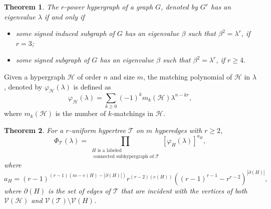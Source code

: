 \documentclass[10pt,a4paper]{article}
\newtheorem{proposition}{Proposition}[section]
\newtheorem{theorem}{Theorem}[section]
\begin{document}
	
	\begin{theorem}\cite{chen2023all}\label{eigenvalues_of_power}
		The $r$-power hypergraph of a graph $G$, denoted by $G^r$  has an eigenvalue $\lambda$ if and only if 
		\begin{itemize}
			\item some signed induced subgraph of $G$ has an eigenvalue $\beta$ such that $\beta^2 = \lambda^r$, if $r =3$;
			\item some signed subgraph of $G$ has an eigenvalue $\beta$ such that $\beta^2= \lambda^r$, if $r \geq 4$.
		\end{itemize}
	\end{theorem}
	
	\noindent Given a hypergraph $\mathcal{H}$ of order $n$ and size $m$, the matching polynomial of $\mathcal{H}$ in $\lambda$, denoted by $\varphi_{\mathcal{H}}(\lambda)$ is defined as 
	$$\varphi_{\mathcal{H}}(\lambda) = \sum\limits_{k \geq 0} (-1)^k m_k(\mathcal{H}) \lambda^{n-kr},$$ where $m_k(\mathcal{H})$ is the number of $k$-matchings in $\mathcal{H}$.
	
	\begin{theorem}\cite{li2024relationship}\label{relation_between_matching_characteristic}
		For a $r$-uniform hypertree $\mathcal{T}$ on $m$ hyperedges with $r\geq 2$,
		$$\Phi_{\mathcal{T}}(\lambda)= \prod\limits_{\substack{{H} \text{ is a labeled} \\ \text{ connected subhypergraph of } \mathcal{T}}} [\varphi_{H}(\lambda)]^{a_{{H}}},$$
		where  
		$a_H=(r-1)^{(r-1)(m-e(H)-|\partial(H)|)} r^{(r-2)(e(H))} ((r-1)^{r-1}-r^{r-2})^{|\partial(H)|},$ where $\partial(H) $ is the set of edges of $\mathcal{T}$ that are incident with the vertices of both $\mathcal{V}(\mathcal{H})$ and $\mathcal{V}(\mathcal{T})\setminus \mathcal{V}(H)$.
	\end{theorem}
	
	
	
	
	
\end{document}
